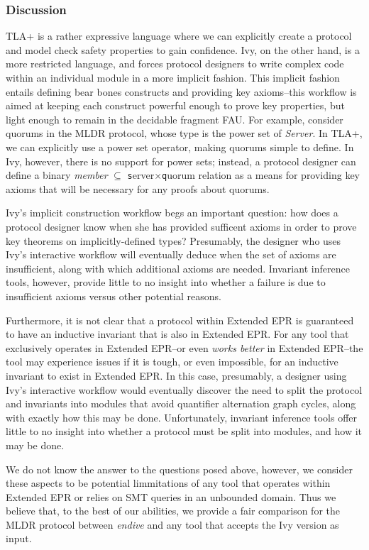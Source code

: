 \documentclass[runningheads]{llncs}
\newcommand{\ivy}[1]{{\texttt #1}}
\begin{document}
\subsubsection{Discussion}

TLA+ is a rather expressive language where we can explicitly create a protocol and model check safety properties to gain confidence.  Ivy, on the other hand, is a more restricted language, and forces protocol designers to write complex code within an individual module in a more implicit fashion.  This implicit fashion entails defining bear bones constructs and providing key axioms--this workflow is aimed at keeping each construct powerful enough to prove key properties, but light enough to remain in the decidable fragment FAU.  For example, consider quorums in the MLDR protocol, whose type is the power set of \textit{Server}.  In TLA+, we can explicitly use a power set operator, making quorums simple to define.  In Ivy, however, there is no support for power sets; instead, a protocol designer can define a binary \textit{member} ${\scriptstyle\subseteq}$ \ivy{server}$\times$\ivy{quorum} relation as a means for providing key axioms that will be necessary for any proofs about quorums.

Ivy's implicit construction workflow begs an important question: how does a protocol designer know when she has provided sufficent axioms in order to prove key theorems on implicitly-defined types?  Presumably, the designer who uses Ivy's interactive workflow will eventually deduce when the set of axioms are insufficient, along with which additional axioms are needed.  Invariant inference tools, however,  provide little to no insight into whether a failure is due to insufficient axioms versus other potential reasons.

Furthermore, it is not clear that a protocol within Extended EPR is guaranteed to have an inductive invariant that is also in Extended EPR.  For any tool that exclusively operates in Extended EPR--or even \textit{works better} in Extended EPR--the tool may experience issues if it is tough, or even impossible, for an inductive invariant to exist in Extended EPR.  In this case, presumably, a designer using Ivy's interactive workflow would eventually discover the need to split the protocol and invariants into modules that avoid quantifier alternation graph cycles, along with exactly how this may be done.  Unfortunately, invariant inference tools offer little to no insight into whether a protocol must be split into modules, and how it may be done.

We do not know the answer to the questions posed above, however, we consider these aspects to be potential limmitations of any tool that operates within Extended EPR or relies on SMT queries in an unbounded domain.  Thus we believe that, to the best of our abilities, we provide a fair comparison for the MLDR protocol between \textit{endive} and any tool that accepts the Ivy version as input.





\end{document}
